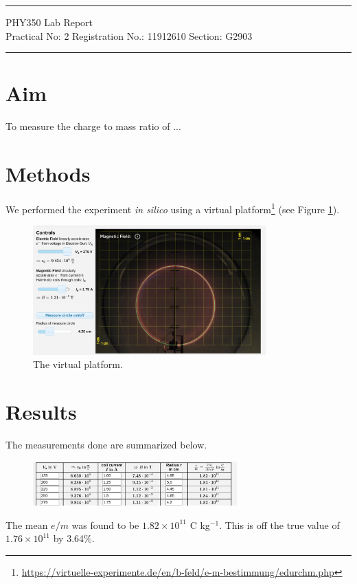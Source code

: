 \documentclass{article}
\begin{document}
	
	\author{Aayush Arya}
	\date{(Submitted: \today)}
	\title{}
	
	\maketitle
	
	\hrule
	\begin{center}
		PHY350 Lab Report\\
		Practical No: 2 \quad Registration No.: 11912610 \quad Section: G2903
	\end{center}
	\hrule
	
	\section*{Aim}
	To measure the charge to mass ratio of ...
	
	\section*{Methods}
	We performed the experiment {\it in silico} using a virtual platform\footnote{\url{https://virtuelle-experimente.de/en/b-feld/e-m-bestimmung/edurchm.php}} (see Figure \ref{fig:sim}).
	
	\begin{figure}[h]
		\centering
		\includegraphics[width=0.8\textwidth]{e_m_ratio}
		\caption{The virtual platform.}
		\label{fig:sim}	
	\end{figure}
	
	\section*{Results}\begin{center}
		
	\end{center}
	The measurements done are summarized below.
	
	\begin{figure}[h]
		\centering
		\includegraphics[width=0.7\textwidth]{observations}
	\end{figure}
	
	The mean $e/m$ was found to be $1.82\times10^{11}$ C kg$^{-1}$. This is off the true value of $1.76\times 10^{11}$ by 3.64\%.
	
\end{document}
